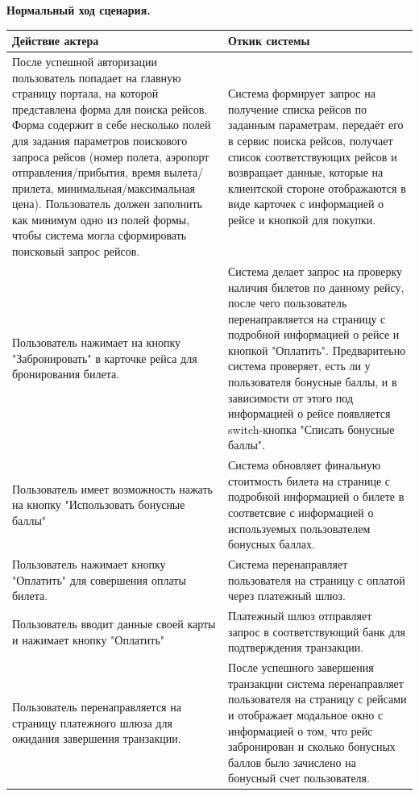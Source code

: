 \textbf{Нормальный ход сценария.}
\begin{longtable}{|p{8cm}|p{8cm}|}
    \hline
    \textbf{Действие актера} & \textbf{Откик системы} \\
    \endhead
    
    \hline
    После успешной авторизации пользователь попадает на главную страницу портала, на которой представлена форма для поиска рейсов. Форма содержит в себе несколько полей для задания параметров поискового запроса рейсов
    (номер полета, аэропорт отправления/прибытия, время вылета/прилета, минимальная/максимальная цена). Пользователь должен заполнить как минимум одно из полей формы, чтобы система могла сформировать поисковый запрос рейсов. &
    Система формирует запрос на получение списка рейсов по заданным параметрам, передаёт его в сервис поиска рейсов, получает список соответствующих рейсов и возвращает данные, которые на клиентской стороне отображаются в виде карточек с информацией о рейсе и кнопкой для покупки. \\

    \hline
    Пользователь нажимает на кнопку "Забронировать" в карточке рейса для бронирования билета. & 
    Система делает запрос на проверку наличия билетов по данному рейсу, после чего пользователь перенаправляется на страницу с подробной информацией о рейсе и кнопкой "Оплатить".
    Предваритеьно система проверяет, есть ли у пользователя бонусные баллы, и в зависимости от этого под информацией о рейсе появляется switch-кнопка "Списать бонусные баллы". \\
    
    \hline
    Пользователь имеет возможность нажать на кнопку "Использовать бонусные баллы" & 
    Система обновляет финальную стоитмость билета на странице с подробной информацией о билете в соответсвие с информацией о используемых пользователем бонусных баллах. \\
    
    \hline
    Пользователь нажимает кнопку "Оплатить" для совершения оплаты билета. & 
    Система перенаправляет пользователя на страницу с оплатой через платежный шлюз. \\
    
    \hline 
    Пользователь вводит данные своей карты и нажимает кнопку "Оплатить"
    & Платежный шлюз отправляет запрос в соответствующий банк для подтверждения транзакции. \\
    
    \hline
    Пользователь перенаправляется на страницу платежного шлюза для ожидания завершения транзакции.
    & После успешного завершения транзакции система перенаправляет пользователя на страницу с рейсами и отображает модальное окно с информацией о том, что рейс забронирован и сколько бонусных баллов было зачислено на бонусный счет пользователя. \\
    \hline
\end{longtable}

